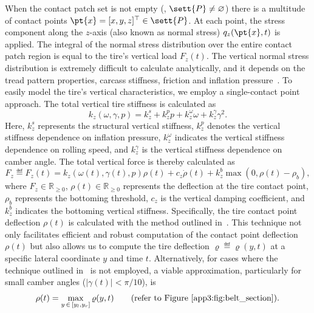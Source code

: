 When the contact patch set is not empty (\ie{}, $\sett{P} \neq \varnothing$) there is a multitude of contact points $\pt{x} = [x,y,z]^\top \in \sett{P}$. At each point, the stress component along the $z$-axis (also known as normal stress) $q_z(\pt{x},t)$ is applied. The integral of the normal stress distribution over the entire contact patch region is equal to the tire's vertical load $F_z(t)$. The vertical normal stress distribution is extremely difficult to calculate analytically, and it depends on the tread pattern properties, carcass stiffness, friction and inflation pressure~\cite{nakajima2019advanced}. To easily model the tire's vertical characteristics, we employ a single-contact point approach. The total vertical tire stiffness is calculated as
%
\begin{equation}
  k_z(\omega, \gamma, p) = k_z^s + k_z^p p + k_z^\omega \omega + k_z^\gamma \gamma^2.
\end{equation}
%
Here, $k_z^s$ represents the structural vertical stiffness, $k_z^p$ denotes the vertical stiffness dependence on inflation pressure, $k_z^\omega$ indicates the vertical stiffness dependence on rolling speed, and $k_z^\gamma$ is the vertical stiffness dependence on camber angle. The total vertical force is thereby calculated as
%
\begin{equation}
  F_z \eqdef F_z(t) = k_z(\omega(t), \gamma(t), p) \rho(t) + c_z \dot{\rho}(t) + k_z^b \max(0, \rho(t)-\rho_b),
  \label{app3:eq:vertical_force}
\end{equation}
%
where $F_z \in \mathbb{R}_{\geq 0}$, $\rho(t) \in \mathbb{R}_{\geq 0}$ represents the deflection at the tire contact point, $\rho_b$ represents the bottoming threshold, $c_z$ is the vertical damping coefficient, and $k_z^b$ indicates the bottoming vertical stiffness. Specifically, the tire contact point deflection $\rho(t)$ is calculated with the method outlined in~\cite{stocco2024novel, stocco2021acme}. This technique not only facilitates efficient and robust computation of the contact point deflection $\rho(t)$ but also allows us to compute the tire deflection $\varrho \eqdef \varrho(y,t)$ at a specific lateral coordinate $y$ and time $t$. Alternatively, for cases where the technique outlined in~\cite{stocco2024novel} is not employed, a viable approximation, particularly for small camber angles ($|\gamma(t)| < \pi/10$), is
%
\begin{equation}
  \rho(t) = \max_{y \, \in \, [y_l, y_r]} \varrho(y,t) \qquad \text{(refer to \figurename~\ref{app3:fig:belt_section})}.
\end{equation}

